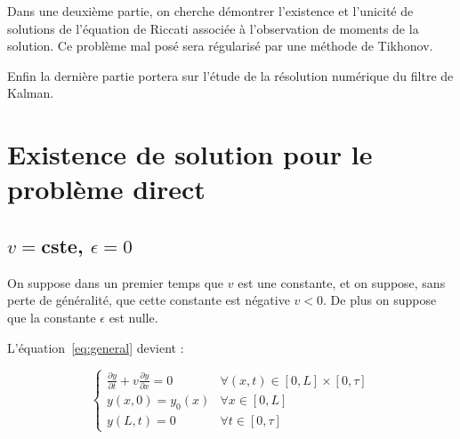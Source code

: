 \documentclass[a4paper]{article}
\begin{document}
Dans une deuxième partie, on cherche démontrer l'existence et l'unicité de solutions
de l'équation de Riccati associée à l'observation de moments de la solution.
Ce problème mal posé sera régularisé par une méthode de Tikhonov.

Enfin la dernière partie portera sur l'étude de la résolution numérique 
du filtre de Kalman.

\newpage
\section{Existence de solution pour le problème direct}




\subsection{$v=$cste, $\epsilon = 0$}



On suppose dans un premier temps que $v$ est une constante, et on suppose,
sans perte de généralité, 
que cette constante est négative $v<0$.
De plus on suppose que la constante $\epsilon$ est nulle.

L'équation~\eqref{eq:general} devient :

\begin{equation}
\label{eq:cas0}
\begin{cases}
 \displaystyle \frac{\partial y}{\partial t}
 + v \frac{\partial y} {\partial x}  
 = 0  & \forall (x,t) \in [0,L] \times [0, \tau]\\
 y(x,0) = y_{0} (x) & \forall x \in [0,L] \\
 y(L,t) = 0 & \forall t \in [0,\tau]
\end{cases}
\end{equation}
\end{document}
